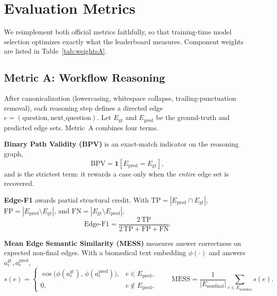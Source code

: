 \documentclass[11pt]{article}
\begin{document}
\section{Evaluation Metrics}
\label{sec:metrics}
We reimplement both official metrics faithfully, so that training-time model
selection optimizes exactly what the leaderboard measures. Component weights are
listed in Table~\ref{tab:weightsA}.

\subsection{Metric A: Workflow Reasoning}
After canonicalization (lowercasing, whitespace collapse, trailing-punctuation
removal), each reasoning step defines a directed edge
$e=(\text{question},\text{next\_question})$. Let $E_{\text{gt}}$ and
$E_{\text{pred}}$ be the ground-truth and predicted edge sets. Metric~A combines
four terms.

\noindent\textbf{Binary Path Validity (BPV)} is an exact-match indicator on the
reasoning graph,
\begin{equation}
\mathrm{BPV}=\mathbf{1}\!\left[E_{\text{pred}}=E_{\text{gt}}\right],
\end{equation}
and is the strictest term: it rewards a case only when the \emph{entire} edge set
is recovered.

\noindent\textbf{Edge-F1} awards partial structural credit. With
$\mathrm{TP}=|E_{\text{pred}}\cap E_{\text{gt}}|$,
$\mathrm{FP}=|E_{\text{pred}}\setminus E_{\text{gt}}|$, and
$\mathrm{FN}=|E_{\text{gt}}\setminus E_{\text{pred}}|$,
\begin{equation}
\mathrm{Edge\text{-}F1}=\frac{2\,\mathrm{TP}}{2\,\mathrm{TP}+\mathrm{FP}+\mathrm{FN}}.
\end{equation}

\noindent\textbf{Mean Edge Semantic Similarity (MESS)} measures answer
correctness on expected non-final edges. With a biomedical text embedding
$\phi(\cdot)$ and answers $a^{\text{gt}}_e,a^{\text{pred}}_e$,
\begin{equation}
s(e)=\begin{cases}
\cos\!\big(\phi(a^{\text{gt}}_e),\,\phi(a^{\text{pred}}_e)\big), & e\in E_{\text{pred}},\\[2pt]
0, & e\notin E_{\text{pred}},
\end{cases}
\qquad
\mathrm{MESS}=\frac{1}{|E_{\text{nonfinal}}|}\sum_{e\in E_{\text{nonfinal}}} s(e).
\end{equation}
\end{document}
